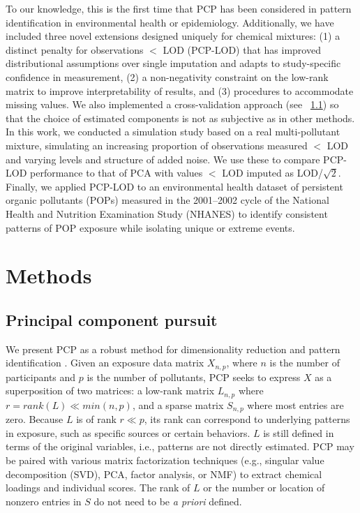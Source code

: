 To our knowledge, this is the first time that PCP has been considered in pattern identification in environmental health or epidemiology. Additionally, we have included three novel extensions designed uniquely for chemical mixtures: (1) a distinct penalty for observations $<$ LOD (PCP-LOD) that has improved distributional assumptions over single imputation and adapts to study-specific confidence in measurement, (2) a non-negativity constraint on the low-rank matrix to improve interpretability of results, and (3) procedures to accommodate missing values. We also implemented a cross-validation approach (see ~\ref{methods:stat}) so that the choice of estimated components is not as subjective as in other methods. In this work, we conducted a simulation study based on a real multi-pollutant mixture, simulating an increasing proportion of observations measured $<$ LOD and varying levels and structure of added noise. We use these to compare PCP-LOD performance to that of PCA with values $<$ LOD imputed as LOD/$\sqrt{2}$. Finally, we applied PCP-LOD to an environmental health dataset of persistent organic pollutants (POPs) measured in the 2001--2002 cycle of the National Health and Nutrition Examination Study (NHANES) to identify consistent patterns of POP exposure while isolating unique or extreme events.

\section{Methods}

\subsection{Principal component pursuit}
\label{methods:stat}
We present PCP as a robust method for dimensionality reduction and pattern identification \citep{candes2011robust}. Given an exposure data matrix $X_{n,p}$, where $n$ is the number of participants and $p$ is the number of pollutants, PCP seeks to express $X$ as a superposition of two matrices: a low-rank matrix $L_{n,p}$ where $r = rank(L) \ll min(n,p)$, and a sparse matrix $S_{n,p}$ where most entries are zero. Because $L$ is of rank $r \ll p$, its rank can correspond to underlying patterns in exposure, such as specific sources or certain behaviors. $L$ is still defined in terms of the original variables, i.e., patterns are not directly estimated. PCP may be paired with various matrix factorization techniques (e.g., singular value decomposition (SVD), PCA, factor analysis, or NMF) to extract chemical loadings and individual scores. The rank of $L$ or the number or location of nonzero entries in $S$ do not need to be \textit{a priori} defined.

